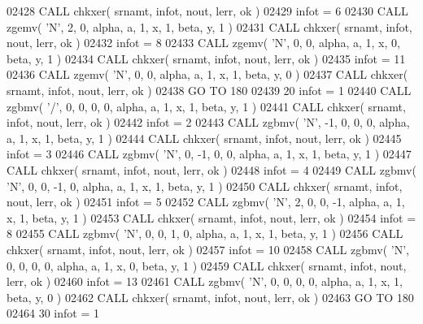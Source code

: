 \begin{DoxyCode}
02428       \textcolor{keyword}{CALL }chkxer( srnamt, infot, nout, lerr, ok )
02429       infot = 6
02430       \textcolor{keyword}{CALL }zgemv( \textcolor{stringliteral}{'N'}, 2, 0, alpha, a, 1, x, 1, beta, y, 1 )
02431       \textcolor{keyword}{CALL }chkxer( srnamt, infot, nout, lerr, ok )
02432       infot = 8
02433       \textcolor{keyword}{CALL }zgemv( \textcolor{stringliteral}{'N'}, 0, 0, alpha, a, 1, x, 0, beta, y, 1 )
02434       \textcolor{keyword}{CALL }chkxer( srnamt, infot, nout, lerr, ok )
02435       infot = 11
02436       \textcolor{keyword}{CALL }zgemv( \textcolor{stringliteral}{'N'}, 0, 0, alpha, a, 1, x, 1, beta, y, 0 )
02437       \textcolor{keyword}{CALL }chkxer( srnamt, infot, nout, lerr, ok )
02438       \textcolor{keywordflow}{GO TO} 180
02439    20 infot = 1
02440       \textcolor{keyword}{CALL }zgbmv( \textcolor{stringliteral}{'/'}, 0, 0, 0, 0, alpha, a, 1, x, 1, beta, y, 1 )
02441       \textcolor{keyword}{CALL }chkxer( srnamt, infot, nout, lerr, ok )
02442       infot = 2
02443       \textcolor{keyword}{CALL }zgbmv( \textcolor{stringliteral}{'N'}, -1, 0, 0, 0, alpha, a, 1, x, 1, beta, y, 1 )
02444       \textcolor{keyword}{CALL }chkxer( srnamt, infot, nout, lerr, ok )
02445       infot = 3
02446       \textcolor{keyword}{CALL }zgbmv( \textcolor{stringliteral}{'N'}, 0, -1, 0, 0, alpha, a, 1, x, 1, beta, y, 1 )
02447       \textcolor{keyword}{CALL }chkxer( srnamt, infot, nout, lerr, ok )
02448       infot = 4
02449       \textcolor{keyword}{CALL }zgbmv( \textcolor{stringliteral}{'N'}, 0, 0, -1, 0, alpha, a, 1, x, 1, beta, y, 1 )
02450       \textcolor{keyword}{CALL }chkxer( srnamt, infot, nout, lerr, ok )
02451       infot = 5
02452       \textcolor{keyword}{CALL }zgbmv( \textcolor{stringliteral}{'N'}, 2, 0, 0, -1, alpha, a, 1, x, 1, beta, y, 1 )
02453       \textcolor{keyword}{CALL }chkxer( srnamt, infot, nout, lerr, ok )
02454       infot = 8
02455       \textcolor{keyword}{CALL }zgbmv( \textcolor{stringliteral}{'N'}, 0, 0, 1, 0, alpha, a, 1, x, 1, beta, y, 1 )
02456       \textcolor{keyword}{CALL }chkxer( srnamt, infot, nout, lerr, ok )
02457       infot = 10
02458       \textcolor{keyword}{CALL }zgbmv( \textcolor{stringliteral}{'N'}, 0, 0, 0, 0, alpha, a, 1, x, 0, beta, y, 1 )
02459       \textcolor{keyword}{CALL }chkxer( srnamt, infot, nout, lerr, ok )
02460       infot = 13
02461       \textcolor{keyword}{CALL }zgbmv( \textcolor{stringliteral}{'N'}, 0, 0, 0, 0, alpha, a, 1, x, 1, beta, y, 0 )
02462       \textcolor{keyword}{CALL }chkxer( srnamt, infot, nout, lerr, ok )
02463       \textcolor{keywordflow}{GO TO} 180
02464    30 infot = 1

\end{DoxyCode}
